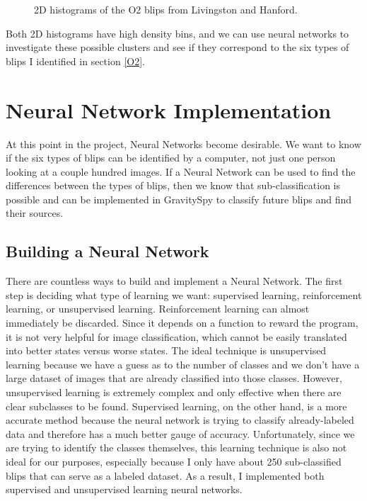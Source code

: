 \documentclass[a4paper]{article}
\begin{document}
\begin{figure}[h!]
\begin{subfigure}{.49\textwidth}
		\label{fig:lho_2d}
	\end{subfigure}
	\caption{2D histograms of the O2 blips from Livingston and Hanford.}
	\label{fig:hists_2d}
\end{figure}

Both 2D histograms have high density bins, and we can use neural networks to investigate these possible clusters and see if they correspond to the six types of blips I identified in section \ref{O2}. 

\section{Neural Network Implementation}

At this point in the project, Neural Networks become desirable. We want to know if the six types of blips can be identified by a computer, not just one person looking at a couple hundred images. If a Neural Network can be used to find the differences between the types of blips, then we know that sub-classification is possible and can be implemented in GravitySpy to classify future blips and find their sources.

\subsection{Building a Neural Network}

There are countless ways to build and implement a Neural Network. The first step is deciding what type of learning we want: supervised learning, reinforcement learning, or unsupervised learning. Reinforcement learning can almost immediately be discarded. Since it depends on a function to reward the program, it is not very helpful for image classification, which cannot be easily translated into better states versus worse states. The ideal technique is unsupervised learning because we have a guess as to the number of classes and we don't have a large dataset of images that are already classified into those classes. However, unsupervised learning is extremely complex and only effective when there are clear subclasses to be found. Supervised learning, on the other hand, is a more accurate method because the neural network is trying to classify already-labeled data and therefore has a much better gauge of accuracy. Unfortunately, since we are trying to identify the classes themselves, this learning technique is also not ideal for our purposes, especially because I only have about 250 sub-classified blips that can serve as a labeled dataset. As a result, I implemented both supervised and unsupervised learning neural networks.
\end{document}
